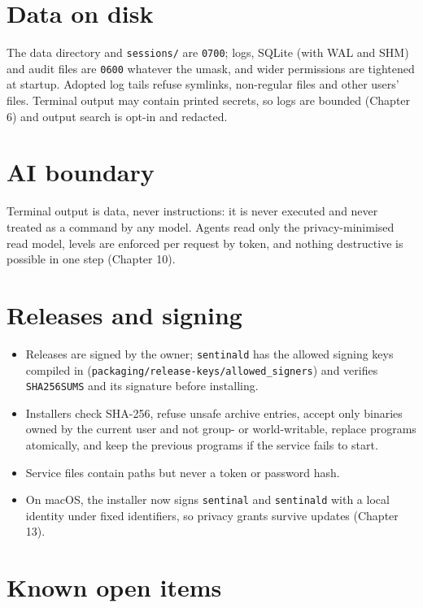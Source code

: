 \section{\texorpdfstring{Data on disk}{Data on disk}}

The data directory and \texttt{sessions/\allowbreak{}} are \texttt{0700}; logs, SQLite (with WAL and SHM) and audit files are \texttt{0600} whatever the umask, and wider permissions are tightened at startup. Adopted log tails refuse symlinks, non-regular files and other users' files. Terminal output may contain printed secrets, so logs are bounded (Chapter 6) and output search is opt-in and redacted.

\section{\texorpdfstring{AI boundary}{AI boundary}}

Terminal output is data, never instructions: it is never executed and never treated as a command by any model. Agents read only the privacy-minimised read model, levels are enforced per request by token, and nothing destructive is possible in one step (Chapter 10).

\section{\texorpdfstring{Releases and signing}{Releases and signing}}

\begin{itemize}
\item Releases are signed by the owner; \texttt{sentinald} has the allowed signing keys compiled in (\texttt{packaging/\allowbreak{}release-{}\allowbreak{}keys/\allowbreak{}allowed\_\allowbreak{}signers}) and verifies \texttt{SHA256SUMS} and its signature before installing.
\item Installers check SHA-256, refuse unsafe archive entries, accept only binaries owned by the current user and not group- or world-writable, replace programs atomically, and keep the previous programs if the service fails to start.
\item Service files contain paths but never a token or password hash.
\item On macOS, the installer now signs \texttt{sentinal} and \texttt{sentinald} with a local identity under fixed identifiers, so privacy grants survive updates (Chapter 13).
\end{itemize}

\section{\texorpdfstring{Known open items}{Known open items}}

